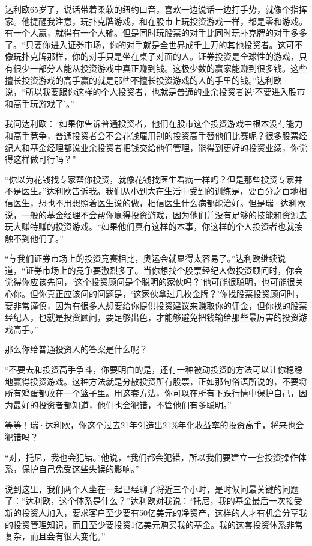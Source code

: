 达利欧65岁了，说话带着柔软的纽约口音，喜欢一边说话一边打手势，就像个指挥家。他提醒我注意，玩扑克牌游戏，和在股市上玩投资游戏一样，都是零和游戏。有一个人赢，就得有一个人输。但是同时玩股票的对手比同时玩扑克牌的对手多多了。“只要你进入证券市场，你的对手就是全世界成千上万的其他投资者。这可不像玩扑克牌那样，你的对手只是坐在桌子对面的人。证券投资是全球性的游戏，只有很少一部分人能从投资游戏中真正赚到钱。这极少数的赢家能赚到很多钱。这些擅长投资游戏的高手赢的就是那些不擅长投资游戏的人的手里的钱。”达利欧说，“所以我要跟你这样的个人投资者，也就是普通的业余投资者说‘不要进入股市和高手玩游戏了’。”

我问达利欧：“如果你告诉普通投资者，他们在股市这个投资游戏中根本没有能力和高手竞争，普通投资者会不会花钱雇用别的投资高手替他们比赛呢？很多股票经纪人和基金经理都说业余投资者把钱交给他们管理，能得到更好的投资业绩，你觉得这样做可行吗？”

“你以为花钱找专家帮你投资，就像花钱找医生看病一样吗？但是那些投资专家并不是医生。”达利欧告诉我。我们从小到大在生活中受到的训练是，要百分之百地相信医生，想也不用想照着医生说的做，相信医生什么病都能治好。但是瑞·达利欧说，一般的基金经理不会帮你赢得投资游戏，因为他们并没有足够的技能和资源去玩大赚特赚的投资游戏。“如果他们真有这样的本事，你这样的个人投资者也就接触不到他们了。”

“与我们证券市场上的投资竞赛相比，奥运会就显得太容易了。”达利欧继续说道，“证券市场上的竞争要激烈多了。当你想找个股票经纪人做投资顾问时，你会觉得你应该先问，‘这个投资顾问是个聪明的家伙吗？’他可能很聪明，也可能很关心你。但你真正应该问的问题是，‘这家伙拿过几枚金牌？’你找股票投资顾问时，要非常谨慎，因为有很多人想要给你提供投资建议来赚取你的佣金，但你找的股票经纪人，也就是投资顾问，要足够出色，才能够避免把钱输给那些最厉害的投资游戏高手。”

那么你给普通投资人的答案是什么呢？

“不要去和投资高手争斗，你要明白的是，还有一种被动投资的方法可以让你稳稳地赢得投资游戏。这种方法就是分散投资所有股票，正如那句俗语所说的，不要将所有鸡蛋都放在一个篮子里。用这套方法，你可以在所有下跌行情中保护自己，因为最好的投资者都知道，他们也会犯错，不管他们有多聪明。”

等等！瑞·达利欧，你这个过去21年创造出21\%年化收益率的投资高手，将来也会犯错吗？

“对，托尼，我也会犯错。”他说，“我们都会犯错，所以我们要建立一套投资操作体系，保护自己免受这些失误的影响。”

说到这里，我们两个人坐在一起已经聊了将近三个小时，是时候问最关键的问题了：“达利欧，这个体系是什么？”达利欧对我说：“托尼，我的基金最后一次接受新的投资人加入，要求客户至少要有50亿美元的净资产，这样的人才有机会分享我的投资管理知识，而且至少要投资1亿美元购买我的基金。我的这套投资体系非常复杂，而且会有很大变化。”

